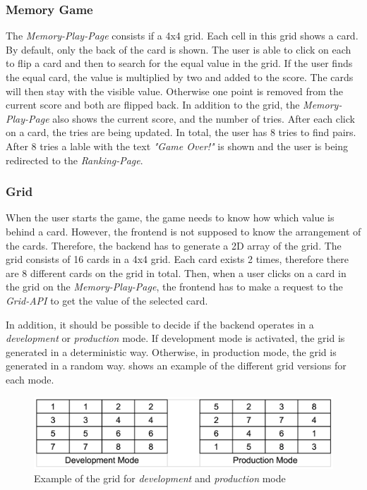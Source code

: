 \subsubsection{Memory Game}\label{subsubsec:02_design_backend_game}
The \textit{Memory-Play-Page} consists if a 4x4 grid. Each cell in this grid shows a card. By default, only the back of the card is shown.
The user is able to click on each to flip a card and then to search for the equal value in the grid. If the user finds the equal card, the value is multiplied by two and added to the score. The cards will then stay with the visible value. Otherwise one point is removed from the current score and both are flipped back.
In addition to the grid, the \textit{Memory-Play-Page} also shows the current score, and the number of tries.
After each click on a card, the tries are being updated. In total, the user has 8 tries to find pairs. After 8 tries a lable with the text \textit{"Game Over!"} is shown and the user is being redirected to the \textit{Ranking-Page}.

\subsubsection{Grid}\label{subsubsec:02_design_backend_grid}
When the user starts the game, the game needs to know how which value is behind a card. However, the frontend is not supposed to know the arrangement of the cards. 
Therefore, the backend has to generate a 2D array of the grid.
The grid consists of 16 cards in a 4x4 grid. Each card exists 2 times, therefore there are 8 different cards on the grid in total.
Then, when a user clicks on a card in the grid on the \textit{Memory-Play-Page}, the frontend has to make a request to the \textit{Grid-API} to get the value of the selected card.

In addition, it should be possible to decide if the backend operates in a \textit{development} or \textit{production} mode.
If development mode is activated, the grid is generated in a deterministic way.
Otherwise, in production mode, the grid is generated in a random way.
 shows an example of the different grid versions for each mode.
\begin{figure}[h]
\centering
\includegraphics[scale=0.2]{images/02_design/backend/grid-dev-prod-mode.png}
\caption{Example of the grid for \textit{development} and \textit{production} mode}
\label{fig:02_design_backend_grid_grid}
\end{figure}


